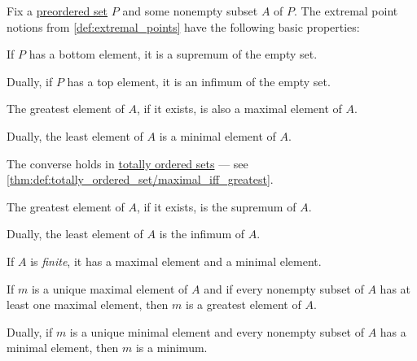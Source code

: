 \begin{proposition}\label{thm:def:extremal_points}
  Fix a \hyperref[def:preordered_set]{preordered set} \( P \) and some nonempty subset \( A \) of \( P \). The extremal point notions from \cref{def:extremal_points} have the following basic properties:
  \begin{thmenum}
     If \( P \) has a bottom element, it is a supremum of the empty set.

    Dually, if \( P \) has a top element, it is an infimum of the empty set.

     The greatest element of \( A \), if it exists, is also a maximal element of \( A \).

    Dually, the least element of \( A \) is a minimal element of \( A \).

    The converse holds in \hyperref[def:totally_ordered_set]{totally ordered sets} --- see \cref{thm:def:totally_ordered_set/maximal_iff_greatest}.

     The greatest element of \( A \), if it exists, is the supremum of \( A \).

    Dually, the least element of \( A \) is the infimum of \( A \).

     If \( A \) is \emph{finite}, it has a maximal element and a minimal element.

     If \( m \) is a unique maximal element of \( A \) and if every nonempty subset of \( A \) has at least one maximal element, then \( m \) is a greatest element of \( A \).

    Dually, if \( m \) is a unique minimal element and every nonempty subset of \( A \) has a minimal element, then \( m \) is a minimum.
  \end{thmenum}
\end{proposition}
